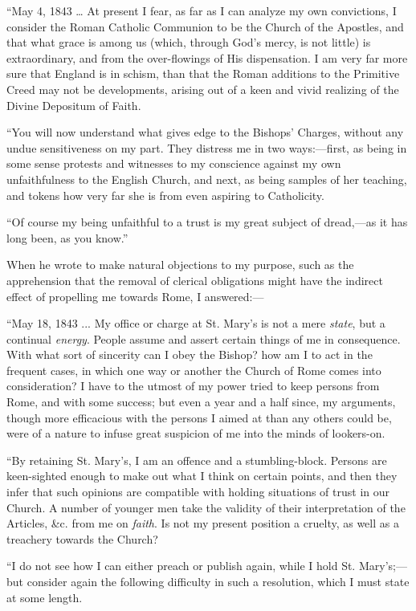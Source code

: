 ``May 4, 1843 … At present I fear, as far as I can analyze my
own convictions, I consider the Roman Catholic Communion to be the
Church of the Apostles, and that what grace is among us (which, through
God's mercy, is not little) is extraordinary, and from the over-flowings
of His dispensation. I am very far more sure that England is in schism,
than that the Roman additions to the Primitive Creed may not be
developments, arising out of a keen and vivid realizing of the Divine
Depositum of Faith.

``You will now understand what gives edge to the Bishops'
Charges, without any undue sensitiveness on my part. They distress me in
two ways:—first, as being in some sense protests and witnesses to my
conscience against my own unfaithfulness to the English Church, and
next, as being samples of her teaching, and tokens how very far she is
from even aspiring to Catholicity.

``Of course my being unfaithful to a trust is my great subject of
dread,—as it has long been, as you know.''

When he wrote to make natural objections to my purpose, such as
the apprehension that the removal of clerical obligations might have the
indirect effect of propelling me towards Rome, I answered:—

``May 18, 1843 ... My office or charge at St. Mary's is not a
mere \emph{state}, but a continual \emph{energy}. People assume and
assert certain things of me in consequence. With what sort of sincerity
can I obey the Bishop? how am I to act in the frequent cases, in which
one way or another the Church of Rome comes into consideration? I have
to the utmost of my power tried to keep persons from Rome, and with some
success; but even a year and a half since, my arguments, though more
efficacious with the persons I aimed at than any others could be, were
of a nature to infuse great suspicion of me into the minds of
lookers-on.

``By retaining St. Mary's, I am an offence and a stumbling-block.
Persons are keen-sighted enough to make out what I think on certain
points, and then they infer that such opinions are compatible with
holding situations of trust in our Church. A number of younger men take
the validity of their interpretation of the Articles, \&c. from me
on \emph{faith}. Is not my present position a cruelty, as well as a treachery
towards the Church?

``I do not see how I can either preach or publish again, while I
hold St. Mary's;—but consider again the following difficulty in
such a resolution, which I must state at some length.


